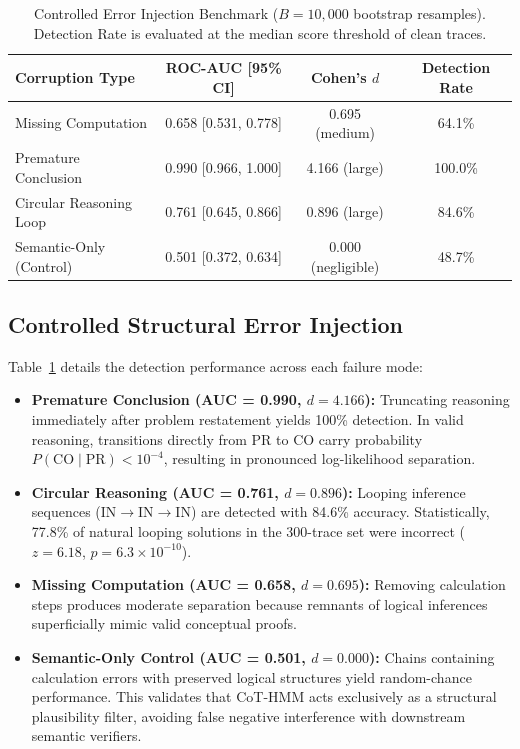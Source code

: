 \documentclass{llncs}
\begin{document}
\begin{table}[t]
\caption{Controlled Error Injection Benchmark ($B=10{,}000$ bootstrap resamples). Detection Rate is evaluated at the median score threshold of clean traces.}
\label{tab:main_results}
\centering
\begin{tabular}{lccc}
\toprule
\textbf{Corruption Type} & \textbf{ROC-AUC [95\% CI]} & \textbf{Cohen's $d$} & \textbf{Detection Rate} \\
\midrule
Missing Computation       & 0.658 [0.531, 0.778] & 0.695 (medium)     & 64.1\% \\
Premature Conclusion      & 0.990 [0.966, 1.000] & 4.166 (large)      & 100.0\% \\
Circular Reasoning Loop   & 0.761 [0.645, 0.866] & 0.896 (large)      & 84.6\% \\
Semantic-Only (Control)   & 0.501 [0.372, 0.634] & 0.000 (negligible) & 48.7\% \\
\bottomrule
\end{tabular}
\end{table}

\subsection{Controlled Structural Error Injection}

Table~\ref{tab:main_results} details the detection performance across each failure mode:
\begin{itemize}
    \item \textbf{Premature Conclusion (AUC = 0.990, $d = 4.166$):} Truncating reasoning immediately after problem restatement yields 100\% detection. In valid reasoning, transitions directly from PR to CO carry probability $P(\text{CO}\mid\text{PR}) < 10^{-4}$, resulting in pronounced log-likelihood separation.
    \item \textbf{Circular Reasoning (AUC = 0.761, $d = 0.896$):} Looping inference sequences (IN$\rightarrow$IN$\rightarrow$IN) are detected with 84.6\% accuracy. Statistically, 77.8\% of natural looping solutions in the 300-trace set were incorrect ($z=6.18$, $p=6.3\times 10^{-10}$).
    \item \textbf{Missing Computation (AUC = 0.658, $d = 0.695$):} Removing calculation steps produces moderate separation because remnants of logical inferences superficially mimic valid conceptual proofs.
    \item \textbf{Semantic-Only Control (AUC = 0.501, $d = 0.000$):} Chains containing calculation errors with preserved logical structures yield random-chance performance. This validates that CoT-HMM acts exclusively as a structural plausibility filter, avoiding false negative interference with downstream semantic verifiers.
\end{itemize}
\end{document}
